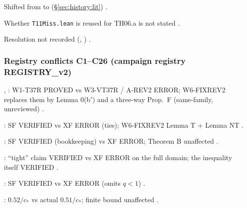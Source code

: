 \begin{uncertain}
Shifted from  to  (\S\ref{sec:history:lit}) .
\end{uncertain}
\begin{uncertain}
Whether \texttt{T11Miss.lean} is reused for TH06.a is not stated .
\end{uncertain}
\begin{uncertain}
Resolution not recorded (, ) .
\end{uncertain}

\subsubsection*{Registry conflicts C1--C26 (campaign registry REGISTRY\_v2)}
\begin{uncertain}
, : W1-T37R PROVED vs W3-VT37R / A-REV2 ERROR; W6-FIXREV2 replaces them by Lemma 0(b$'$) and a three-way Prop.~F (same-family, unreviewed) .
\end{uncertain}
\begin{uncertain}[C2 · TD$'_P$ iff DS]
: SF VERIFIED vs XF ERROR (ties); W6-FIXREV2 Lemma T + Lemma NT .
\end{uncertain}
\begin{uncertain}[C3 · Prop U]
: SF VERIFIED (bookkeeping) vs XF ERROR; Theorem B unaffected .
\end{uncertain}
\begin{uncertain}
: ``tight'' claim VERIFIED vs XF ERROR on the full domain; the inequality itself VERIFIED .
\end{uncertain}
\begin{uncertain}[C5 · E3(ii)]
: SF VERIFIED vs XF ERROR (omits $q<1$) .
\end{uncertain}
\begin{uncertain}
: $0.52/c_*$ vs actual $0.51/c_*$; finite bound unaffected .
\end{uncertain}
